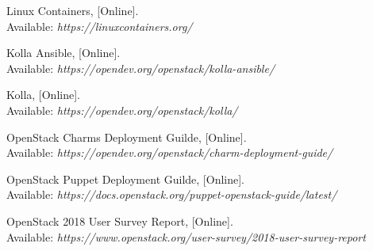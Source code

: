 \documentclass[officiallayout]{tktla}
\begin{document}
\begin{thebibliography}{9}
Linux Containers, [Online]. \\
Available: \textit{https://linuxcontainers.org/}

Kolla Ansible, [Online]. \\
Available: \textit{https://opendev.org/openstack/kolla-ansible/}

Kolla, [Online]. \\
Available: \textit{https://opendev.org/openstack/kolla/}

OpenStack Charms Deployment Guilde, [Online]. \\
Available: \textit{https://opendev.org/openstack/charm-deployment-guide/}

OpenStack Puppet Deployment Guilde, [Online]. \\
Available: \textit{https://docs.openstack.org/puppet-openstack-guide/latest/}

OpenStack 2018 User Survey Report, [Online]. \\
Available: \textit{https://www.openstack.org/user-survey/2018-user-survey-report}

\end{thebibliography}
\end{document}
